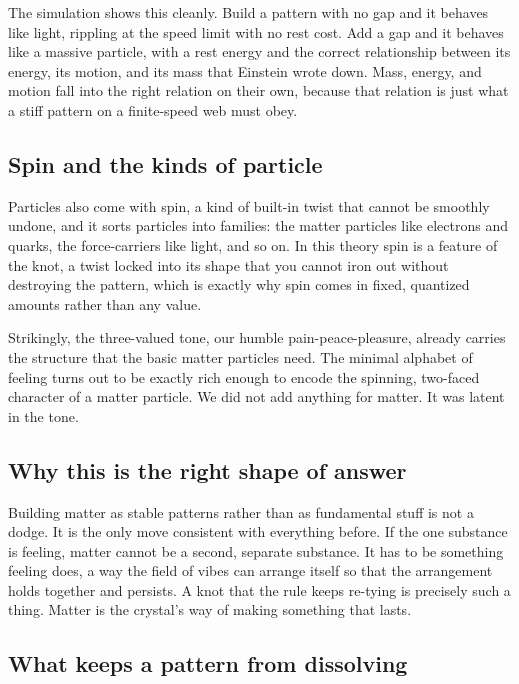 The simulation shows this cleanly. Build a pattern with no gap and it behaves like light, rippling at the speed limit with no rest cost. Add a gap and it behaves like a massive particle, with a rest energy and the correct relationship between its energy, its motion, and its mass that Einstein wrote down. Mass, energy, and motion fall into the right relation on their own, because that relation is just what a stiff pattern on a finite-speed web must obey.

\subsection{Spin and the kinds of particle}

Particles also come with spin, a kind of built-in twist that cannot be smoothly undone, and it sorts particles into families: the matter particles like electrons and quarks, the force-carriers like light, and so on. In this theory spin is a feature of the knot, a twist locked into its shape that you cannot iron out without destroying the pattern, which is exactly why spin comes in fixed, quantized amounts rather than any value.

Strikingly, the three-valued tone, our humble pain-peace-pleasure, already carries the structure that the basic matter particles need. The minimal alphabet of feeling turns out to be exactly rich enough to encode the spinning, two-faced character of a matter particle. We did not add anything for matter. It was latent in the tone.

\subsection{Why this is the right shape of answer}

Building matter as stable patterns rather than as fundamental stuff is not a dodge. It is the only move consistent with everything before. If the one substance is feeling, matter cannot be a second, separate substance. It has to be something feeling does, a way the field of vibes can arrange itself so that the arrangement holds together and persists. A knot that the rule keeps re-tying is precisely such a thing. Matter is the crystal's way of making something that lasts.

\subsection{What keeps a pattern from dissolving}

